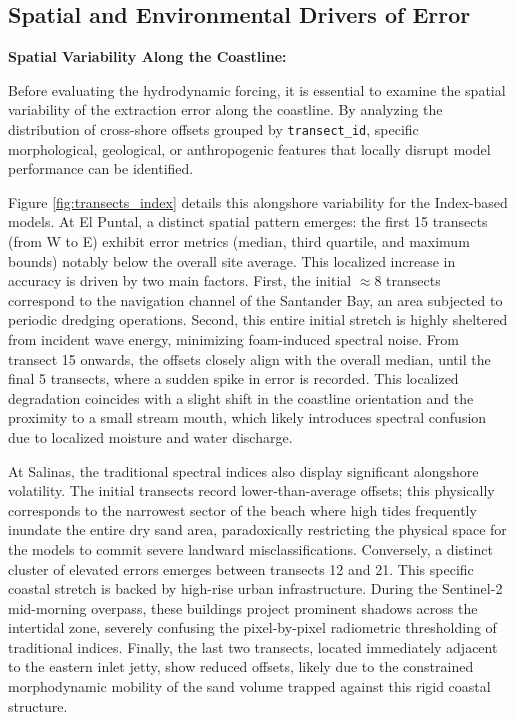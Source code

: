 ﻿\documentclass[ENG]{TFUOC}%
\begin{document}

\subsection{Spatial and Environmental Drivers of Error}
\label{subsec:spatial_environmental_drivers}

\textbf{Spatial Variability Along the Coastline:}

Before evaluating the hydrodynamic forcing, it is essential to examine the spatial variability of the extraction error along the coastline. By analyzing the distribution of cross-shore offsets grouped by \texttt{transect\_id}, specific morphological, geological, or anthropogenic features that locally disrupt model performance can be identified.

Figure \ref{fig:transects_index} details this alongshore variability for the Index-based models. At El Puntal, a distinct spatial pattern emerges: the first 15 transects (from W to E) exhibit error metrics (median, third quartile, and maximum bounds) notably below the overall site average. This localized increase in accuracy is driven by two main factors. First, the initial $\approx8$ transects correspond to the navigation channel of the Santander Bay, an area subjected to periodic dredging operations. Second, this entire initial stretch is highly sheltered from incident wave energy, minimizing foam-induced spectral noise. From transect 15 onwards, the offsets closely align with the overall median, until the final 5 transects, where a sudden spike in error is recorded. This localized degradation coincides with a slight shift in the coastline orientation and the proximity to a small stream mouth, which likely introduces spectral confusion due to localized moisture and water discharge.

At Salinas, the traditional spectral indices also display significant alongshore volatility. The initial transects record lower-than-average offsets; this physically corresponds to the narrowest sector of the beach where high tides frequently inundate the entire dry sand area, paradoxically restricting the physical space for the models to commit severe landward misclassifications. Conversely, a distinct cluster of elevated errors emerges between transects 12 and 21. This specific coastal stretch is backed by high-rise urban infrastructure. During the Sentinel-2 mid-morning overpass, these buildings project prominent shadows across the intertidal zone, severely confusing the pixel-by-pixel radiometric thresholding of traditional indices. Finally, the last two transects, located immediately adjacent to the eastern inlet jetty, show reduced offsets, likely due to the constrained morphodynamic mobility of the sand volume trapped against this rigid coastal structure.
\end{document}
